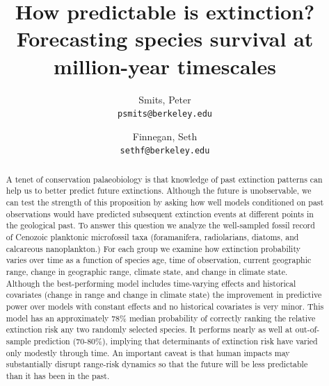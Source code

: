 \documentclass[12pt,letterpaper]{article}
\title{How predictable is extinction? Forecasting species survival at million-year timescales}
\author{
 Smits, Peter\\
 \texttt{psmits@berkeley.edu} 
 \and
 Finnegan, Seth\\
 \texttt{sethf@berkeley.edu}
}
\date{}
\begin{document}
\begin{refsection}

\maketitle

\linenumbers{}
\modulolinenumbers[3]

\begin{abstract}
 A tenet of conservation palaeobiology is that knowledge of past extinction patterns can help us to better predict future extinctions. Although the future is unobservable, we can test the strength of this proposition by asking how well models conditioned on past observations would have predicted subsequent extinction events at different points in the geological past. To answer this question we analyze the well-sampled fossil record of Cenozoic planktonic microfossil taxa (foramanifera, radiolarians, diatoms, and calcareous nanoplankton.) For each group we examine how extinction probability varies over time as a function of species age, time of observation, current geographic range, change in geographic range, climate state, and change in climate state. Although the best-performing model includes time-varying effects and historical covariates (change in range and change in climate state) the improvement in predictive power over models with constant effects and no historical covariates is very minor. This model has an approximately 78\% median probability of correctly ranking the relative extinction risk any two randomly selected species. It performs nearly as well at out-of-sample prediction (70-80\%), implying that determinants of extinction risk have varied only modestly through time. An important caveat is that human impacts may substantially disrupt range-risk dynamics so that the future will be less predictable than it has been in the past.


\end{abstract}
\end{refsection}
\end{document}

